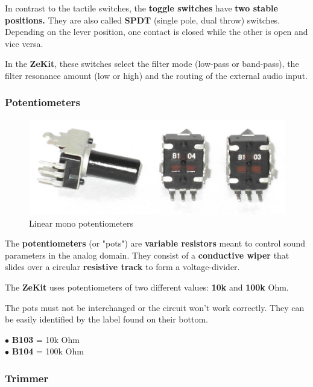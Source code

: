 \documentclass{scrartcl}
\begin{document}
In contrast to the tactile switches, the \textbf{toggle switches} have \textbf{two stable positions.} They are also called \textbf{SPDT} (single pole, dual throw) switches.
Depending on the lever position, one contact is closed while the other is open and vice versa.

In the \textbf{ZeKit}, these switches select the filter mode (low-pass or band-pass), the filter resonance amount (low or high) and the routing of the external audio input.

\subsubsection{Potentiometers}

\begin{figure}[!ht]
    \begin{center}
        \includegraphics[scale=0.25]{assets/zekit-pots.jpg}
        \caption{Linear mono potentiometers}
    \end{center}
\end{figure}

The \textbf{potentiometers} (or "pots") are \textbf{variable resistors} meant to control sound parameters in the analog domain. They consist of a \textbf{conductive wiper} that slides over a circular \textbf{resistive track} to form a voltage-divider.

The \textbf{ZeKit} uses potentiometers of two different values: \textbf{10k} and \textbf{100k} Ohm.

The pots must not be interchanged or the circuit won't work correctly. They can be easily identified by the label found on their bottom.

$\bullet$ \textbf{B103} = 10k Ohm\\
$\bullet$ \textbf{B104} = 100k Ohm\\

\subsubsection{Trimmer}
\end{document}
